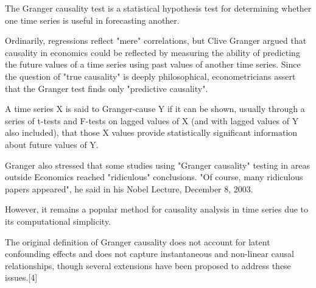 The Granger causality test is a statistical hypothesis test for determining whether one time series is useful in forecasting another. 

Ordinarily, regressions reflect "mere" correlations, but Clive Granger argued that causality in economics could be reflected by measuring the ability of predicting the future values of a time series using past values of another time series. Since the question of "true causality" is deeply philosophical, econometricians assert that the Granger test finds only "predictive causality".
 
A time series X is said to Granger-cause Y if it can be shown, usually through a series of t-tests and F-tests on lagged values of X (and with lagged values of Y also included), that those X values provide statistically significant information about future values of Y.
 
Granger also stressed that some studies using "Granger causality" testing in areas outside Economics reached "ridiculous" conclusions. "Of course, many ridiculous papers appeared", he said in his Nobel Lecture, December 8, 2003. 

However, it remains a popular method for causality analysis in time series due to its computational simplicity. 

The original definition of Granger causality does not account for latent confounding effects and does not capture instantaneous and non-linear causal relationships, though several extensions have been proposed to address these issues.[4]
